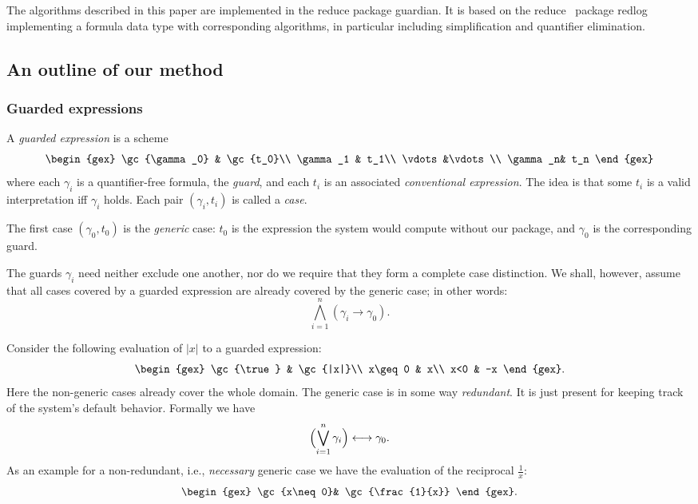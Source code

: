 The algorithms described in this paper are implemented in the {\sc
reduce} package {\sc guardian}. It is based on the {\sc
reduce}~\cite{HearnFitch:95,Melenk:95} package {\sc
redlog}~\cite{DolzmannSturm:96,DolzmannSturm:96a} implementing a
formula data type with corresponding algorithms, in particular
including simplification and quantifier elimination.

\subsection{An outline of our method}
\subsubsection{Guarded expressions}
A {\em guarded expression} is a scheme
$$
\begin{gex}
\gc{\gamma_0} & \gc{t_0}\\
\gamma_1 & t_1\\
\vdots&\vdots\\
\gamma_n& t_n
\end{gex}
$$
where each $\gamma_i$ is a quantifier-free formula, the {\em guard},
and each $t_i$ is an associated {\em conventional expression}. The
idea is that some $t_i$ is a valid interpretation iff $\gamma_i$
holds. Each pair $(\gamma_i,t_i)$ is called a {\em case}.

The first case $(\gamma_0,t_0)$ is the {\em generic} case: $t_0$ is
the expression the system would compute without our package, and
$\gamma_0$ is the corresponding guard.

The guards $\gamma_i$ need neither exclude one another, nor do we
require that they form a complete case distinction. We shall, however,
assume that all cases covered by a guarded expression are already
covered by the generic case; in other words:
\begin{equation}
\bigwedge_{i=1}^n(\gamma_i\longrightarrow\gamma_0).\label{gencoversall}
\end{equation}

Consider the following evaluation of $|x|$ to a guarded expression:
$$
\begin{gex}
\gc{\true} & \gc{|x|}\\
x\geq0 & x\\
x<0 & -x
\end{gex}.
$$
Here the non-generic cases already cover the whole domain. The
generic case is in some way {\em redundant}. It is just present for
keeping track of the system's default behavior. Formally we have
\begin{equation}
\Bigl(\bigvee_{i=1}^n\gamma_i\Bigr)\longleftrightarrow\gamma_0.
\label{formalredund}
\end{equation}
As an example for a non-redundant, i.e., {\em necessary} generic case
we have the evaluation of the reciprocal $\frac{1}{x}$:
$$
\begin{gex}
\gc{x\neq0}& \gc{\frac{1}{x}}
\end{gex}.
$$

